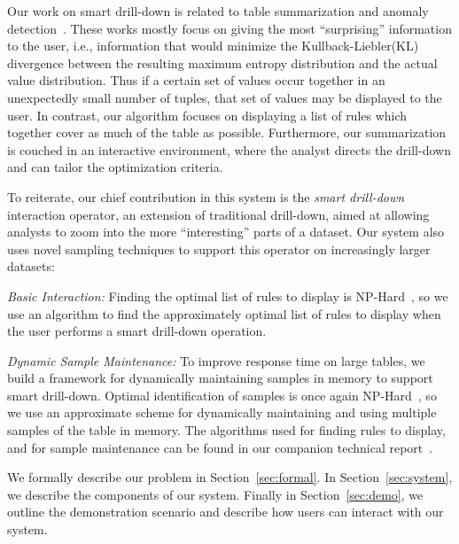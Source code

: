 \noindent Our work on smart drill-down is related
to table summarization and anomaly
detection~\cite{Sarawagi:2001:UMA:767141.767148,
Sarawagi00user-adaptiveexploration,
Sarawagi98discovery-drivenexploration,
DBLP:journals/pvldb/GebalyAGKS14}.
These works mostly focus on
giving the most ``surprising'' information to the user, i.e., information
that would minimize the Kullback-Liebler(KL) divergence between the
resulting maximum entropy distribution and the actual value distribution. Thus if a certain set of
values occur together in an unexpectedly small number of tuples, that
set of values may be displayed to the user. In contrast, our algorithm
focuses on displaying a list of rules which together cover as
much of the table as possible.
Furthermore, our summarization is couched in
an interactive environment, where the analyst
directs the drill-down and can tailor the optimization criteria.

To reiterate, our chief contribution in this system is the {\em smart drill-down} interaction operator,
an extension of traditional drill-down, aimed at allowing analysts to zoom into the
more ``interesting'' parts of a dataset. Our system also uses novel sampling techniques to support this operator on increasingly larger datasets:
\squishlist
\item {\em Basic Interaction:} Finding the optimal list of rules to display is {\sc NP-Hard}~\cite{tr}, so we use  an algorithm to find the approximately optimal list of rules to display when the user performs a smart drill-down operation. 
\item {\em Dynamic Sample Maintenance:} To improve response time on large tables, we build a framework for dynamically
maintaining samples in memory to support smart drill-down. 
Optimal identification of samples is once again {\sc NP-Hard}~\cite{tr}, so 
we use an approximate scheme for dynamically maintaining and using multiple samples of the table in memory.
\squishend
The algorithms used for finding rules to display, and for sample maintenance can be found in our 
companion technical report~\cite{tr}.

We formally describe our 
problem in Section~\ref{sec:formal}. 
In Section~\ref{sec:system}, we describe the components of our system. 
Finally in Section~\ref{sec:demo}, we outline the demonstration scenario and describe how users can interact with our system. 